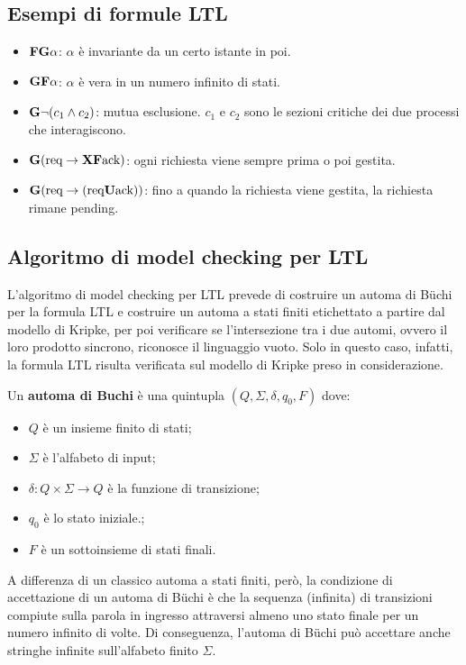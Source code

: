 \subsection*{Esempi di formule LTL}
\begin{itemize}
    \item $\textnormal{\textbf{F}} \textnormal{\textbf{G}} \alpha$: $\alpha$ è invariante da un certo
    istante in poi.
    \item $\textnormal{\textbf{G}} \textnormal{\textbf{F}} \alpha$: $\alpha$ è vera in un numero
    infinito di stati.
    \item $\textnormal{\textbf{G}} \lnot (c_1 \land c_2)$: mutua esclusione. $c_1$ e
    $c_2$ sono le sezioni critiche dei due processi che interagiscono.
    \item $\textnormal{\textbf{G}} (\text{req} \rightarrow \textnormal{\textbf{X}} \textnormal{\textbf{F}} \text{ack})$:
    ogni richiesta viene sempre prima o poi gestita.
    \item $\textnormal{\textbf{G}} (\text{req} \rightarrow (\text{req} \textnormal{\textbf{U}} \text{ack}))$:
    fino a quando la richiesta viene gestita, la richiesta rimane pending.
\end{itemize}

\subsection*{Algoritmo di model checking per LTL}
L'algoritmo di model checking per LTL prevede di costruire un automa di
B\"uchi per la formula LTL e costruire un automa a stati finiti etichettato
a partire dal modello di Kripke, per poi verificare se l'intersezione
tra i due automi, ovvero il loro prodotto sincrono, riconosce il linguaggio
vuoto. Solo in questo caso, infatti, la formula LTL risulta verificata
sul modello di Kripke preso in considerazione.

\begin{defn}
    Un \textbf{automa di Buchi} è una quintupla $(Q, \Sigma, \delta, q_0, F)$
    dove:
    \begin{itemize}
        \item $Q$ è un insieme finito di stati;
        \item $\Sigma$ è l'alfabeto di input;
        \item $\delta : Q \times \Sigma \rightarrow Q$ è la funzione di transizione;
        \item $q_0$ è lo stato iniziale.;
        \item $F$ è un sottoinsieme di stati finali.
    \end{itemize}
    A differenza di un classico automa a stati finiti, però, la condizione di
    accettazione di un automa di B\"uchi è che la sequenza (infinita)
    di transizioni compiute sulla parola in ingresso attraversi almeno uno
    stato finale per un numero infinito di volte.
    Di conseguenza, l'automa di B\"uchi può accettare anche stringhe infinite
    sull'alfabeto finito $\Sigma$.
\end{defn}

